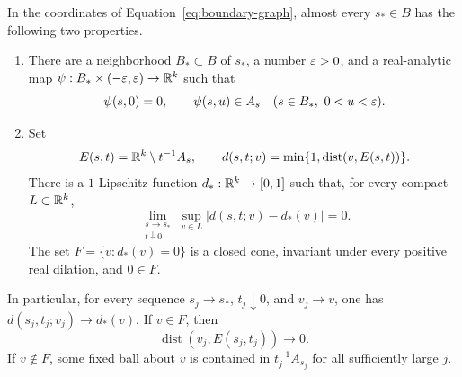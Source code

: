 \begin{proposition}
\label{prop:boundary-data}
In the coordinates of Equation~\eqref{eq:boundary-graph}, almost every
$s_*\in B$ has the following two properties.
\begin{enumerate}[label=\textup{(\roman*)}]
\item There are a neighborhood $B_*\subset B$ of $s_*$, a number
$\varepsilon>0$, and a real-analytic map
$\psi:B_*\times(-\varepsilon,\varepsilon)\to\mathbb R^k$ such that
\[
 \psi(s,0)=0,\qquad
 \psi(s,u)\in A_s\quad(s\in B_*,\ 0<u<\varepsilon).
\]
\item Set
\[
 E(s,t)=\mathbb R^k\setminus t^{-1}A_s,
 \qquad d(s,t;v)=\min\{1,\operatorname{dist}(v,E(s,t))\}.
\]
There is a $1$-Lipschitz function $d_*:\mathbb R^k\to[0,1]$ such that,
for every compact $L\subset\mathbb R^k$,
\begin{equation}
 \lim_{\substack{s\to s_*\\t\downarrow0}}
       \sup_{v\in L}|d(s,t;v)-d_*(v)|=0.
 \label{eq:joint-offset-limit}
\end{equation}
The set $F=\{v:d_*(v)=0\}$ is a closed cone, invariant under every
positive real dilation, and $0\in F$.
\end{enumerate}
In particular, for every sequence $s_j\to s_*$, $t_j\downarrow0$,
and $v_j\to v$, one has $d(s_j,t_j;v_j)\to d_*(v)$.  If $v\in F$,
then
\[
 \operatorname{dist}(v_j,E(s_j,t_j))\longrightarrow0.
\]
If $v\notin F$, some fixed ball about $v$ is contained in
$t_j^{-1}A_{s_j}$ for all sufficiently large $j$.
\end{proposition}


